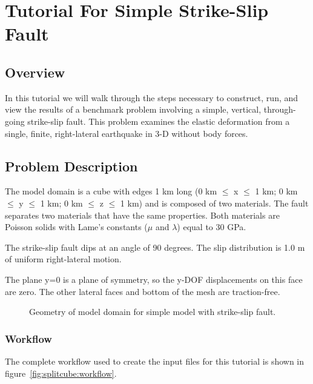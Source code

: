 \section{Tutorial For Simple Strike-Slip Fault}

\subsection{Overview}

In this tutorial we will walk through the steps necessary to
construct, run, and view the results of a benchmark problem involving
a simple, vertical, through-going strike-slip fault. This problem
examines the elastic deformation from a single, finite, right-lateral
earthquake in 3-D without body forces.

\subsection{Problem Description}

The model domain is a cube with edges 1 km long (0 km $\leq$ x $\leq$
1 km; 0 km $\leq$ y $\leq$ 1 km; 0 km $\leq$ z $\leq$ 1 km) and is
composed of two materials. The fault separates two materials that have
the same properties. Both materials are Poisson solids with Lame's
constants ($\mu$ and $\lambda$) equal to 30 GPa.

The strike-slip fault dips at an angle of 90 degrees. The slip
distribution is 1.0 m of uniform right-lateral motion.

The plane y=0 is a plane of symmetry, so the y-DOF displacements on
this face are zero. The other lateral faces and bottom of the mesh are
traction-free.

\begin{figure}
  \begin{center}
    \caption{Geometry of model domain for simple model with strike-slip fault.}
  \end{center}
\end{figure}  

\subsubsection{Workflow}

The complete workflow used to create the input files for this tutorial
is shown in figure~\ref{fig:splitcube:workflow}. 

